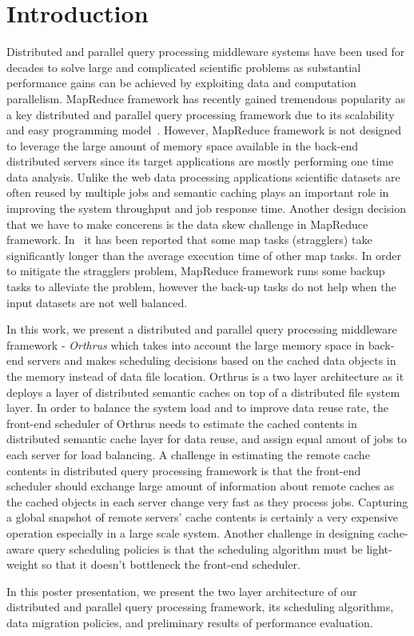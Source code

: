 \section{Introduction}

Distributed and parallel query processing middleware systems have been used for
decades to solve large and complicated scientific problems as substantial
performance gains can be achieved by exploiting data and computation
parallelism.  MapReduce framework has recently gained tremendous popularity as
a key distributed and parallel query processing framework due to its
scalability and easy programming model~\cite{}. However, MapReduce framework is
not designed to leverage the large amount of memory space available in the
back-end distributed servers since its target applications are mostly
performing one time data analysis.  Unlike the web data processing applications
scientific datasets are often reused by multiple jobs and semantic caching
plays an important role in improving the system throughput and job response
time.  Another design decision that we have to make concerens is the data skew
challenge in MapReduce framework. In~\cite{IBRAHIM10, KWON10, LIN09} it has
been reported that some map tasks (stragglers) take significantly longer than
the average execution time of other map tasks. In order to mitigate the
stragglers problem, MapReduce framework runs some backup tasks to alleviate the
problem, however the back-up tasks do not help when the input datasets are not
well balanced. 
  
In this work, we present a distributed and parallel query processing middleware
framework - {\em Orthrus} which takes into account the large memory space in
back-end servers and makes scheduling decisions based on the cached data
objects in the memory instead of data file location. Orthrus is a two layer
architecture as it deploys a layer of distributed semantic caches on top of a
distributed file system layer. In order to balance the system load and to
improve data reuse rate, the front-end scheduler of Orthrus needs to estimate
the cached contents in distributed semantic cache layer for data reuse, and
assign equal amout of jobs to each server for load balancing.  A challenge in
estimating the remote cache contents in distributed query processing framework
is that the front-end scheduler should exchange large amount of information
about remote caches as the cached objects in each server change very fast as
they process jobs. Capturing a global snapshot of remote servers' cache
contents is certainly a very expensive operation especially in a large scale
system. Another challenge in designing cache-aware query scheduling policies is
that the scheduling algorithm must be light-weight so that it doesn't
bottleneck the front-end scheduler. 

In this poster presentation, we present the two layer architecture of
our distributed and parallel query processing framework, its scheduling
algorithms, data migration policies, and preliminary results of performance 
evaluation.

